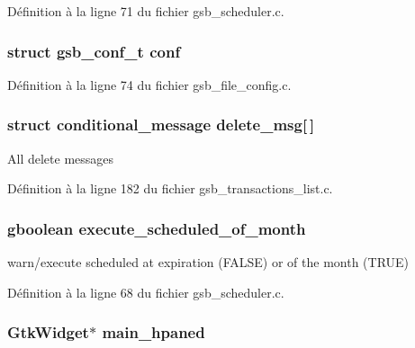 Définition à la ligne 71 du fichier gsb\_\-scheduler.c.

\subsubsection[{conf}]{\setlength{\rightskip}{0pt plus 5cm}struct {\bf gsb\_\-conf\_\-t} {\bf conf}}\label{gsb__file__config_8c_ac390e947e97cef2bec2f5d59d6ec1071}


Définition à la ligne 74 du fichier gsb\_\-file\_\-config.c.

\subsubsection[{delete\_\-msg}]{\setlength{\rightskip}{0pt plus 5cm}struct {\bf conditional\_\-message} {\bf delete\_\-msg}[$\,$]}\label{gsb__file__config_8c_a8be9044200783277533661fc770e77f5}
All delete messages 

Définition à la ligne 182 du fichier gsb\_\-transactions\_\-list.c.

\subsubsection[{execute\_\-scheduled\_\-of\_\-month}]{\setlength{\rightskip}{0pt plus 5cm}gboolean {\bf execute\_\-scheduled\_\-of\_\-month}}\label{gsb__file__config_8c_a28dbce464ef05c5a6db0d64a31fff16d}
warn/execute scheduled at expiration (FALSE) or of the month (TRUE) 

Définition à la ligne 68 du fichier gsb\_\-scheduler.c.

\subsubsection[{main\_\-hpaned}]{\setlength{\rightskip}{0pt plus 5cm}GtkWidget$\ast$ {\bf main\_\-hpaned}}\label{gsb__file__config_8c_a4a46e75f5e42baf4abffc03a92ec3030}


